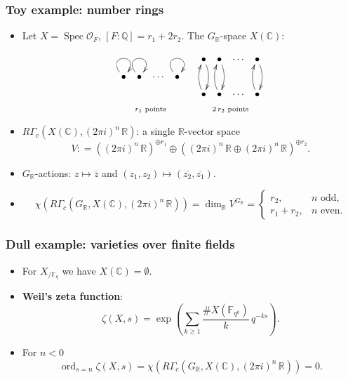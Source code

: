 \documentclass[handout]{beamer}
\newcommand{\QQ}{\mathbb{Q}}
\newcommand{\RR}{\mathbb{R}}
\newcommand{\CC}{\mathbb{C}}
\newcommand{\FF}{\mathbb{F}}
\renewcommand{\O}{\mathcal{O}}
\newcommand{\dfn}{\mathrel{\mathop:}=}
\DeclareMathOperator{\ord}{ord}
\DeclareMathOperator{\Spec}{Spec}
\newcommand{\term}{\textbf}
\begin{document}
\begin{frame}
  \frametitle{Toy example: number rings}

  \begin{itemize}
  \item<2-> Let $X = \Spec \O_F$, $[F : \QQ] = r_1 + 2 r_2$. The $G_\RR$-space
    $X (\CC)$:

    \[ \xymatrix@R=0.75em@C=0.5em{
        & & & & & \bullet\ar@/^0.5em/[dd] & \bullet\ar@/^0.5em/[dd] & \cdots & \bullet\ar@/^0.5em/[dd] \\
        \bullet\ar@(ul,ur) & \bullet\ar@(ul,ur) & \cdots & \bullet\ar@(ul,ur) \\
        & & & & & \bullet\ar@/^0.5em/[uu] & \bullet\ar@/^0.5em/[uu] & \cdots & \bullet\ar@/^0.5em/[uu] \\
        \ar@{}[rrr]|{r_1\text{ points}} & & & & & \ar@{}[rrr]|{2\,r_2\text{ points}} & & & \\
      } \]

  \item<3-> $R\Gamma_c (X(\CC), (2\pi i)^n\,\RR)$: a single $\RR$-vector space
    $$V \dfn ((2\pi i)^n\,\RR)^{\oplus r_1} \oplus ((2\pi i)^n\,\RR \oplus (2\pi i)^n\,\RR)^{\oplus r_2}.$$

  \item<4-> $G_\RR$-actions: $z \mapsto \overline{z}$ and
    $(z_1,z_2) \mapsto (\overline{z_2}, \overline{z_1})$.

  \item<5->
    $$\chi (R\Gamma_c (G_\RR, X (\CC), (2\pi i)^n\,\RR)) =
    \dim_\RR V^{G_\RR} = \begin{cases}
      r_2, & n \text{ odd},\\
      r_1 + r_2, & n \text{ even}.
    \end{cases}$$
  \end{itemize}
\end{frame}


\begin{frame}
  \frametitle{Dull example: varieties over finite fields}

  \begin{itemize}
  \item<2-> For $X_{/\FF_q}$ we have $X (\CC) = \emptyset$.

  \item<3-> \term{Weil's zeta function}:
    $$\zeta (X,s) = \exp \left(\sum_{k\ge 1} \frac{\# X (\FF_{q^k})}{k}\,q^{-ks}\right).$$

  \item<4-> For $n < 0$
    $$\ord_{s=n} \zeta (X,s) = \chi (R\Gamma_c (G_\RR, X (\CC), (2\pi i)^n\,\RR)) = 0.$$
  \end{itemize}
\end{frame}
\end{document}
